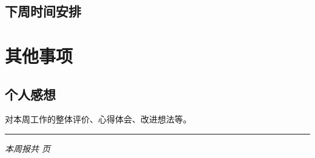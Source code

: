 \documentclass[12pt,a4paper]{article}
\begin{document}
\subsection{下周时间安排}

\begin{comment}
\begin{center}
\begin{tabular}{|c|p{12cm}|}
\hline
\textbf{时间} & \textbf{主要任务} \\
\hline
周一 & 具体安排 \\
\hline
周二 & 具体安排 \\
\hline
周三 & 具体安排 \\
\hline
周四 & 具体安排 \\
\hline
周五 & 具体安排 \\
\hline
周末 & 具体安排 \\
\hline
\end{tabular}
\end{center}
\end{comment}

\section{其他事项}

\begin{comment}
\subsection{需要的支持与帮助}
\begin{itemize}
    \item 需要导师提供的指导和建议
    \item 需要的实验条件或资源
    \item 希望师兄师姐协助的事项
\end{itemize}
\end{comment}

\subsection{个人感想}
对本周工作的整体评价、心得体会、改进想法等。

\vspace{1cm}
\noindent\rule{\textwidth}{0.5pt}
\begin{center}
\textit{本周报共 \pageref{LastPage} 页}
\end{center}
\end{document}
